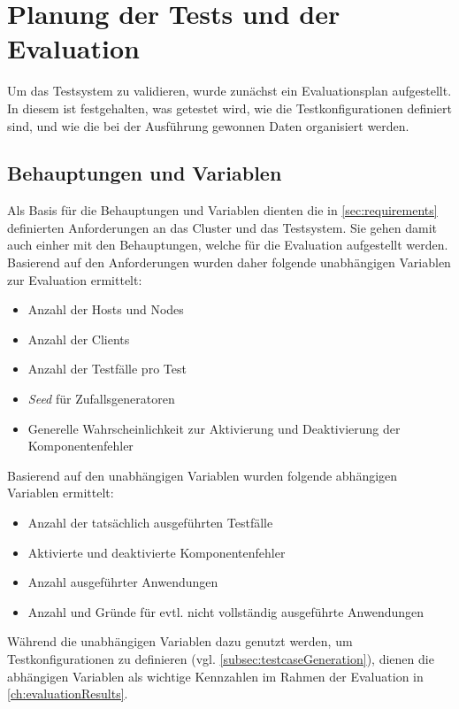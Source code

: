 \section{Planung der Tests und der Evaluation}
\label{sec:evaluationPlan}

Um das Testsystem zu validieren, wurde zunächst ein Evaluationsplan aufgestellt.
In diesem ist festgehalten, was getestet wird, wie die Testkonfigurationen definiert sind, und wie die bei der Ausführung gewonnen Daten organisiert werden.

\subsection{Behauptungen und Variablen}
\label{subsec:theses}

Als Basis für die Behauptungen und Variablen dienten die in \cref{sec:requirements} definierten Anforderungen an das Cluster und das Testsystem.
Sie gehen damit auch einher mit den Behauptungen, welche für die Evaluation aufgestellt werden.
Basierend auf den Anforderungen wurden daher folgende unabhängigen Variablen zur Evaluation ermittelt:

\begin{itemize}
    \item Anzahl der Hosts und Nodes
    \item Anzahl der Clients
    \item Anzahl der Testfälle pro Test
    \item \emph{Seed} für Zufallsgeneratoren
    \item Generelle Wahrscheinlichkeit zur Aktivierung und Deaktivierung der Komponentenfehler
\end{itemize}

Basierend auf den unabhängigen Variablen wurden \uA folgende abhängigen Variablen ermittelt:

\begin{itemize}
    \item Anzahl der tatsächlich ausgeführten Testfälle
    \item Aktivierte und deaktivierte Komponentenfehler
    \item Anzahl ausgeführter Anwendungen
    \item Anzahl und Gründe für evtl. nicht vollständig ausgeführte Anwendungen
\end{itemize}

Während die unabhängigen Variablen dazu genutzt werden, um Testkonfigurationen zu definieren (vgl. \cref{subsec:testcaseGeneration}), dienen die abhängigen Variablen als wichtige Kennzahlen im Rahmen der Evaluation in \cref{ch:evaluationResults}.

